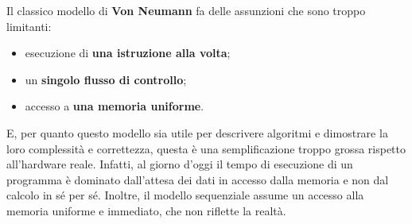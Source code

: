 Il classico modello di \textbf{Von Neumann} fa delle assunzioni che sono troppo limitanti:
\begin{itemize}
    \item esecuzione di \textbf{una istruzione alla volta};
    \item un \textbf{singolo flusso di controllo};
    \item accesso a \textbf{una memoria uniforme}.
\end{itemize}
E, per quanto questo modello sia utile per descrivere algoritmi e dimostrare la loro complessità e correttezza, questa è una semplificazione troppo grossa rispetto all'hardware reale. Infatti, al giorno d'oggi il tempo di esecuzione di un programma è dominato dall'attesa dei dati in accesso dalla memoria e non dal calcolo in sé per sé. Inoltre, il modello sequenziale assume un accesso alla memoria uniforme e immediato, che non riflette la realtà.

